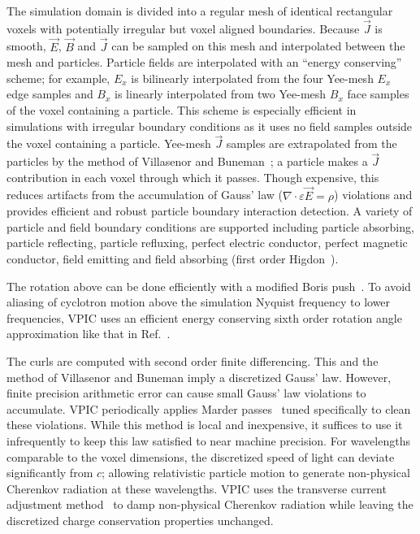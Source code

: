 \documentclass[journal,twoside]{IEEEtran}
\newcommand{\eps}{\varepsilon}
\newcommand{\vecJ}{\vec{J}}
\newcommand{\vecE}{\vec{E}}
\newcommand{\vecB}{\vec{B}}
\newcommand{\Div}[1]{\nabla \cdot #1}
\begin{document}
The simulation domain is divided into a regular mesh of identical
rectangular voxels with potentially irregular but voxel aligned
boundaries.  Because $\vecJ$ is smooth, $\vecE$, $\vecB$ and $\vecJ$
can be sampled on this mesh and interpolated between the mesh and
particles.  Particle fields are interpolated with an ``energy
conserving'' scheme; for example, $E_x$ is bilinearly interpolated
from the four Yee-mesh $E_x$ edge samples and $B_x$ is linearly
interpolated from two Yee-mesh $B_x$ face samples of the voxel
containing a particle.  This scheme is especially efficient in
simulations with irregular boundary conditions as it uses no field
samples outside the voxel containing a particle.  Yee-mesh $\vecJ$
samples are extrapolated from the particles by the method of
Villasenor and Buneman~\cite{Villasenor_Buneman_1992}; a particle
makes a $\vecJ$ contribution in each voxel through which it passes.
Though expensive, this reduces artifacts from the accumulation of
Gauss' law ($\Div{\eps\vecE}=\rho$) violations and provides efficient
and robust particle boundary interaction detection.  A variety of
particle and field boundary conditions are supported including
particle absorbing, particle reflecting, particle refluxing, perfect
electric conductor, perfect magnetic conductor, field emitting and
field absorbing (first order Higdon~\cite{Higdon_1986}).

The rotation above can be done efficiently with a modified Boris
push~\cite{Boris_1970}.  To avoid aliasing of cyclotron motion above the
simulation Nyquist frequency to lower frequencies, VPIC uses an
efficient energy conserving sixth order rotation angle approximation
like that in Ref.~\cite{Blahovec_et_al_2000}.

The curls are computed with second order finite differencing.  This
and the method of Villasenor and Buneman imply a discretized Gauss'
law.  However, finite precision arithmetic error can cause small
Gauss' law violations to accumulate.  VPIC periodically applies Marder
passes~\cite{Marder_1987} tuned specifically to clean these
violations.  While this method is local and inexpensive, it suffices
to use it infrequently to keep this law satisfied to near machine
precision.  For wavelengths comparable to the voxel dimensions, the
discretized speed of light can deviate significantly from $c$;
allowing relativistic particle motion to generate non-physical
Cherenkov radiation at these wavelengths.  VPIC uses the transverse
current adjustment method~\cite{Eastwood_et_al_1995} to damp
non-physical Cherenkov radiation while leaving the discretized charge
conservation properties unchanged.
\end{document}
